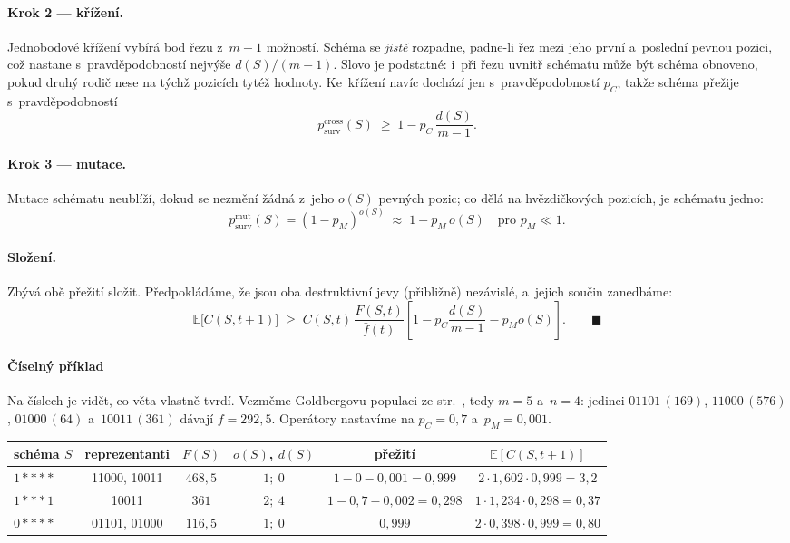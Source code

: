 \documentclass[11pt,a4paper]{article}
\theoremstyle{definition}
\begin{document}
\paragraph{Krok 2 --- křížení.} Jednobodové křížení vybírá bod řezu z~$m-1$
možností. Schéma se \emph{jistě} rozpadne, padne-li řez mezi jeho první
a~poslední pevnou pozici, což nastane s~pravděpodobností nejvýše $d(S)/(m-1)$.
Slovo  je podstatné: i~při řezu uvnitř schématu může být schéma
obnoveno, pokud druhý rodič nese na týchž pozicích tytéž hodnoty. Ke~křížení
navíc dochází jen s~pravděpodobností $p_C$, takže schéma přežije s~pravděpodobností
\[
p_{\mathrm{surv}}^{\mathrm{cross}}(S) \;\ge\; 1 - p_C\,\frac{d(S)}{m-1}.
\]

\paragraph{Krok 3 --- mutace.} Mutace schématu neublíží, dokud se nezmění žádná
z~jeho $o(S)$ pevných pozic; co dělá na hvězdičkových pozicích, je schématu jedno:
\[
p_{\mathrm{surv}}^{\mathrm{mut}}(S) = (1-p_M)^{o(S)} \;\approx\; 1 - p_M\,o(S)
\quad \text{pro } p_M \ll 1 .
\]

\paragraph{Složení.} Zbývá obě přežití složit. Předpokládáme, že jsou oba
destruktivní jevy (přibližně) nezávislé, a~jejich součin zanedbáme:
\[
\mathbb{E}\big[C(S,t+1)\big] \;\ge\; C(S,t)\,\frac{F(S,t)}{\bar f(t)}
\left[1 - p_C \frac{d(S)}{m-1} - p_M o(S)\right]. \qquad\blacksquare
\]

\paragraph{Číselný příklad}

Na číslech je vidět, co věta vlastně tvrdí. Vezměme Goldbergovu populaci ze
str.~\pageref{ex:goldberg}, tedy $m=5$ a~$n=4$: jedinci $01101\,(169)$,
$11000\,(576)$, $01000\,(64)$ a~$10011\,(361)$ dávají $\bar f = 292{,}5$.
Operátory nastavíme na $p_C = 0{,}7$ a~$p_M = 0{,}001$.

\begin{center}
\begin{tabular}{@{}lccccc@{}}
\toprule
schéma $S$ & reprezentanti & $F(S)$ & $o(S)$, $d(S)$ & přežití & $\mathbb{E}[C(S,t{+}1)]$ \\
\midrule
$1{*}{*}{*}{*}$ & 11000, 10011 & $468{,}5$ & $1;\ 0$ &
  $1 - 0 - 0{,}001 = 0{,}999$ &
  $2 \cdot 1{,}602 \cdot 0{,}999 = 3{,}2$ \\
$1{*}{*}{*}1$ & 10011 & $361$ & $2;\ 4$ &
  $1 - 0{,}7 - 0{,}002 = 0{,}298$ &
  $1 \cdot 1{,}234 \cdot 0{,}298 = 0{,}37$ \\
$0{*}{*}{*}{*}$ & 01101, 01000 & $116{,}5$ & $1;\ 0$ &
  $0{,}999$ &
  $2 \cdot 0{,}398 \cdot 0{,}999 = 0{,}80$ \\
\bottomrule
\end{tabular}
\end{center}
\end{document}
